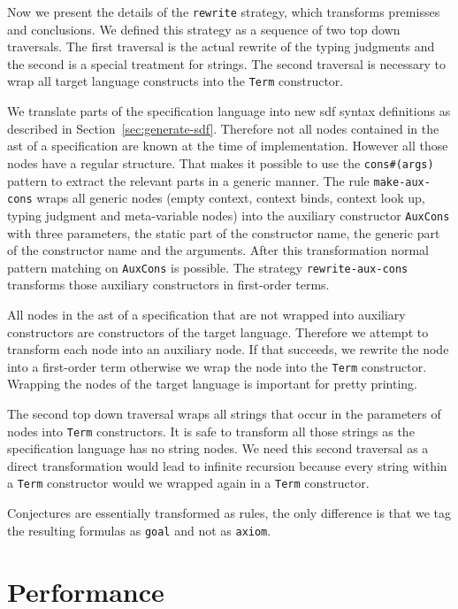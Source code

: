 Now we present the details of the \texttt{rewrite} strategy, which
transforms premisses and conclusions. We defined this strategy as a
sequence of two top down traversals. The first traversal is the actual
rewrite of the typing judgments and the second is a special treatment
for strings. The second traversal is necessary to wrap all target
language constructs into the \verb|Term| constructor.

We translate parts of the specification language into new \gls{sdf}
syntax definitions as described in
Section~\ref{sec:generate-sdf}. Therefore not all nodes contained in
the \gls{ast} of a specification are known at the time of
implementation. However all those nodes have a regular structure. That
makes it possible to use the \verb|cons#(args)| pattern to extract the
relevant parts in a generic manner. The rule \verb|make-aux-cons|
wraps all generic nodes (empty context, context binds, context look
up, typing judgment and meta-variable nodes) into the auxiliary
constructor \verb|AuxCons| with three parameters, the static part of
the constructor name, the generic part of the constructor name and the
arguments. After this transformation normal pattern matching on
\verb|AuxCons| is possible. The strategy \verb|rewrite-aux-cons|
transforms those auxiliary constructors in first-order terms.

All nodes in the \gls{ast} of a specification that are not wrapped
into auxiliary constructors are constructors of the target
language. Therefore we attempt to transform each node into an
auxiliary node. If that succeeds, we rewrite the node into a
first-order term otherwise we wrap the node into the \verb|Term|
constructor. Wrapping the nodes of the target language is important
for pretty printing.

The second top down traversal wraps all strings that occur in the
parameters of nodes into \verb|Term| constructors. It is safe to
transform all those strings as the specification language has no
string nodes. We need this second traversal as a direct transformation
would lead to infinite recursion because every string within a
\verb|Term| constructor would we wrapped again in a \verb|Term|
constructor.

Conjectures are essentially transformed as rules, the only difference
is that we tag the resulting formulas as \verb|goal| and not as
\verb|axiom|.
\section{Performance}
